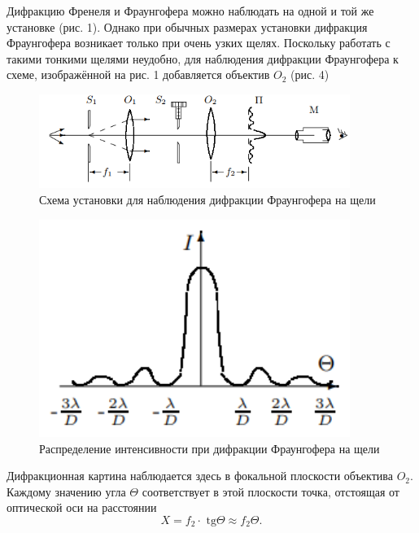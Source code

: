 \documentclass[a4paper,12pt]{article}
\begin{document}
Дифракцию Френеля и Фраунгофера можно наблюдать на одной и той же установке (рис. 1). Однако при обычных размерах установки дифракция Фраунгофера возникает только при очень узких щелях. Поскольку работать с такими тонкими щелями неудобно, для наблюдения
дифракции Фраунгофера к схеме, изображённой на рис. 1 добавляется объектив $O_2$ (рис. 4)

\begin{figure}[H]\label{fig: Fraunhofer diffraction setup}
    \centering
    \includegraphics[width = 0.9\textwidth]{Fraunhofer diffraction setup.png}
    \caption{   Схема установки для наблюдения дифракции Фраунгофера на щели}
\end{figure}

\begin{figure}\label{fig: Fraunhofer diffraction intensity}
    \begin{center}
    \vspace{-20pt}
        \includegraphics[width = 0.9\textwidth]{Fraunhofer diffraction intensity.png}
    \end{center}
    \caption{Распределение интенсивности при дифракции Фраунгофера на щели}
\end{figure}
Дифракционная картина наблюдается здесь в фокальной плоскости объектива $O_2$. Каждому значению угла $\Theta$ соответствует в этой плоскости точка, отстоящая от оптической
оси на расстоянии
\begin{equation}\label{eq: Fraunhofer diffraction X via Theta}
    X = f_2 \cdot\text{ tg}\Theta \approx f_2 \Theta.
\end{equation}
\end{document}
